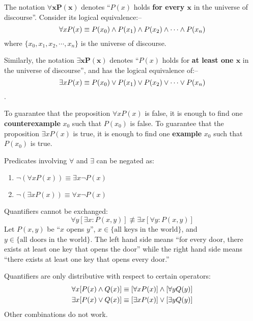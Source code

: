 \begin{definition}
    The notation $\boldsymbol{\forall x P(x)}$
    denotes ``$P(x)$ holds \textbf{for every $\boldsymbol{x}$} in the universe of discourse''.
    Consider its logical equivalence:--
    $$
    \forall x P(x) \equiv P(x_0) \wedge P(x_1) \wedge P(x_2) \wedge \cdots \wedge P(x_n)
    $$
    where $\{x_0, x_1, x_2, \cdots, x_n\}$ is the universe of discourse.

    Similarly, the notation $\boldsymbol{\exists x P(x)}$ denotes ``$P(x)$ holds for \textbf{at least one $\boldsymbol{x}$}
    in the universe of discourse'', and has the logical equivalence of:--
    $$
    \exists x P(x) \equiv P(x_0) \vee P(x_1) \vee P(x_2) \vee \cdots \vee P(x_n)
    $$.
\end{definition}

\begin{theorem}
    To guarantee that the proposition $\forall x P(x)$ is false, it is enough to find one
    \textbf{counterexample} $x_0$ such that $P(x_0)$ is false.
    To guarantee that the proposition $\exists x P(x)$ is true, it is enough to find one
    \textbf{example} $x_0$ such that $P(x_0)$ is true.
\end{theorem}

\begin{theorem}
    Predicates involving $\forall$ and $\exists$ can be negated as:
    \begin{multicols}{2}
        \begin{enumerate}
            \item $\neg(\forall xP(x)) \equiv \exists x \neg P(x)$
            \item $\neg(\exists xP(x)) \equiv \forall x \neg P(x)$
        \end{enumerate}
    \end{multicols}
\end{theorem}

\begin{remark}
    Quantifiers cannot be exchanged:
    $$
    \forall y [\exists x : P(x,y)] \nequiv \exists x [\forall y : P(x, y)]
    $$
    Let $P(x,y)$ be ``$x$ opens $y$'', $x\in\{\text{all keys in the world}\}$, and
    $y\in\{\text{all doors in the world}\}$. The left hand side means ``for every door, there exists
    at least one key that opens the door'' while the right hand side means ``there exists
    at least one key that opens every door.''
\end{remark}

\begin{remark}
    Quantifiers are only distributive with respect to certain operators:
    \begin{align*}
        \forall x [P(x) \wedge Q(x)] &\equiv [\forall x P(x)] \wedge [\forall y Q(y)] \\
        \exists x [P(x) \vee Q(x)] &\equiv [\exists x P(x)] \vee [\exists y Q(y)]
    \end{align*}
    Other combinations do not work.
\end{remark}